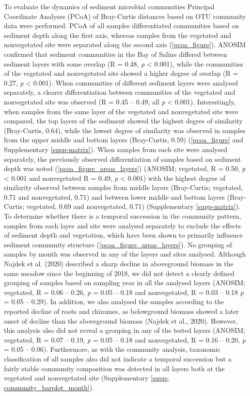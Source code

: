 \documentclass[12pt,]{article}
\begin{document}
To evaluate the dynamics of sediment microbial communities Principal
Coordinate Analyses (PCoA) of Bray-Curtis distances based on OTU
community data were performed. PCoA of all samples differentiated
communities based on sediment depth along the first axis, whereas
samples from the vegetated and nonvegetated site were separated along
the second axis (\autoref{pcoa_figure}). ANOSIM confirmed that sediment
communities in the Bay of Saline differed between sediment layers with
some overlap (R = 0.48, \emph{p} \textless{} 0.001), while the
communities of the vegetated and nonvegetated site showed a higher
degree of overlap (R = 0.27, \emph{p} \textless{} 0.001). When
communities of different sediment layers were analysed separately, a
clearer differentiation between communities of the vegetated and
nonvegetated site was observed (R = 0.45 -- 0.49, all \emph{p}
\textless{} 0.001). Interestingly, when samples from the same layer of
the vegetated and nonvegetated site were compared, the top layers of the
sediment showed the highest degree of similarity (Bray-Curtis, 0.64),
while the lowest degree of similarity was observed in samples from the
upper middle and bottom layers (Bray-Curtis, 0.59)
(\autoref{pcoa_figure} and Supplementary \autoref{supp-matrix}). When
samples from each site were analysed separately, the previously observed
differentiation of samples based on sediment depth was noted
(\autoref{pcoa_figure_areas_layers}) (ANOSIM; vegetated, R = 0.50,
\emph{p} \textless{} 0.001 and nonvegetated R = 0.49, \emph{p}
\textless{} 0.001) with the highest degree of similarity observed
between samples from middle layers (Bray-Curtis; vegetated, 0.71 and
nonvegetated, 0.71) and between lower middle and bottom layers
(Bray-Curtis; vegetated, 0.69 and nonvegetated, 0.71) (Supplementary
\autoref{supp-matrix}). To determine whether there is a temporal
succession in the community pattern, samples from each layer and site
were analysed separately to exclude the effects of sediment depth and
vegetation, which have been shown to primarily influence sediment
community structure (\autoref{pcoa_figure_areas_layers}). No grouping of
samples by month was observed in any of the layers and sites analysed.
Although Najdek et al. (2020) described a sharp decline in aboveground
biomass in the same meadow since the beginning of 2018, we did not
detect a clearly defined grouping of samples based on sampling year in
all the analysed layers (ANOSIM; vegetated, R = 0.06 -- 0.26, \emph{p} =
0.05 -- 0.18 and nonvegetated, R = 0.03 -- 0.18 \emph{p} = 0.05 --
0.29). In addition, we also analysed the samples according to the
reported decline of roots and rhizomes, as belowground biomass showed a
later onset of decline than the aboveground biomass (Najdek et al.,
2020). However, this analysis also did not reveal a grouping in any of
the tested layers (ANOSIM; vegetated, R = 0.07 -- 0.19, \emph{p} = 0.05
-- 0.18 and nonvegetated, R = 0.16 -- 0.20, \emph{p} = 0.05 -- 0.06).
Furthermore, as with the community analysis, taxonomic classification of
all samples also did not indicate a temporal succession but a fairly
stable community composition was detected in all layers both at the
vegetated and nonvegetated site (Supplementary
\autoref{supp-community_barplot_month}).
\end{document}
